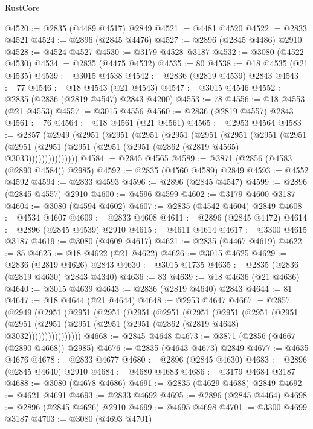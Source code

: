 \begin{lexlean}{RustCore}
\begin{coremodule}
@4520 := @2835 (@4489 @4517) @2849
@4521 := @4481 @4520
@4522 := @2833 @4521
@4524 := @2896 (@2845 @4476)
@4527 := @2896 (@2845 @4486) @2910
@4528 := @4524 @4527
@4530 := @3179 @4528 @3187
@4532 := @3080 (@4522 @4530)
@4534 := @2835 (@4475 @4532)
@4535 := 80
@4538 := @18 @4535 (@21 @4535)
@4539 := @3015 @4538
@4542 := @2836 (@2819 @4539) @2843
@4543 := 77
@4546 := @18 @4543 (@21 @4543)
@4547 := @3015 @4546
@4552 := @2835 (@2836 (@2819 @4547) @2843 @4200)
@4553 := 78
@4556 := @18 @4553 (@21 @4553)
@4557 := @3015 @4556
@4560 := @2836 (@2819 @4557) @2843
@4561 := 76
@4564 := @18 @4561 (@21 @4561)
@4565 := @2953 @4564
@4583 := @2857
    (@2949
      (@2951
        (@2951
          (@2951
            (@2951
              (@2951
                (@2951
                  (@2951
                    (@2951
                      (@2951 (@2951 (@2951 (@2951 (@2951 (@2862 (@2819 @4565) @3033)))))))))))))))
@4584 := @2845 @4565
@4589 := @3871 (@2856 (@4583 (@2890 @4584)) @2985)
@4592 := @2835 (@4560 @4589) @2849
@4593 := @4552 @4592
@4594 := @2833 @4593
@4596 := @2896 (@2845 @4547)
@4599 := @2896 (@2845 @4557) @2910
@4600 := @4596 @4599
@4602 := @3179 @4600 @3187
@4604 := @3080 (@4594 @4602)
@4607 := @2835 (@4542 @4604) @2849
@4608 := @4534 @4607
@4609 := @2833 @4608
@4611 := @2896 (@2845 @4472)
@4614 := @2896 (@2845 @4539) @2910
@4615 := @4611 @4614
@4617 := @3300 @4615 @3187
@4619 := @3080 (@4609 @4617)
@4621 := @2835 (@4467 @4619)
@4622 := 85
@4625 := @18 @4622 (@21 @4622)
@4626 := @3015 @4625
@4629 := @2836 (@2819 @4626) @2843
@4630 := @3015 @1735
@4635 := @2835 (@2836 (@2819 @4630) @2843 @4340)
@4636 := 83
@4639 := @18 @4636 (@21 @4636)
@4640 := @3015 @4639
@4643 := @2836 (@2819 @4640) @2843
@4644 := 81
@4647 := @18 @4644 (@21 @4644)
@4648 := @2953 @4647
@4667 := @2857
    (@2949
      (@2951
        (@2951
          (@2951
            (@2951
              (@2951
                (@2951
                  (@2951
                    (@2951
                      (@2951
                        (@2951
                          (@2951 (@2951 (@2951 (@2951 (@2862 (@2819 @4648) @3032))))))))))))))))
@4668 := @2845 @4648
@4673 := @3871 (@2856 (@4667 (@2890 @4668)) @2985)
@4676 := @2835 (@4643 @4673) @2849
@4677 := @4635 @4676
@4678 := @2833 @4677
@4680 := @2896 (@2845 @4630)
@4683 := @2896 (@2845 @4640) @2910
@4684 := @4680 @4683
@4686 := @3179 @4684 @3187
@4688 := @3080 (@4678 @4686)
@4691 := @2835 (@4629 @4688) @2849
@4692 := @4621 @4691
@4693 := @2833 @4692
@4695 := @2896 (@2845 @4464)
@4698 := @2896 (@2845 @4626) @2910
@4699 := @4695 @4698
@4701 := @3300 @4699 @3187
@4703 := @3080 (@4693 @4701)

\end{coremodule}
\end{lexlean}
